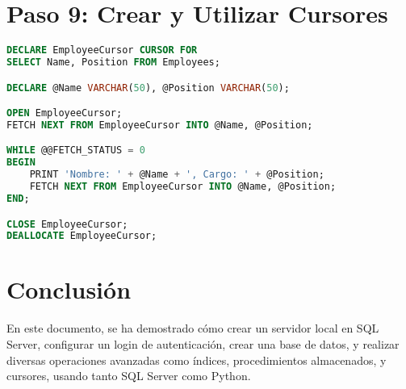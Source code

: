 \documentclass{article}
\begin{document}
\section{Paso 9: Crear y Utilizar Cursores}
\begin{lstlisting}[language=SQL, caption=Uso de cursores para consultas]
DECLARE EmployeeCursor CURSOR FOR
SELECT Name, Position FROM Employees;

DECLARE @Name VARCHAR(50), @Position VARCHAR(50);

OPEN EmployeeCursor;
FETCH NEXT FROM EmployeeCursor INTO @Name, @Position;

WHILE @@FETCH_STATUS = 0
BEGIN
    PRINT 'Nombre: ' + @Name + ', Cargo: ' + @Position;
    FETCH NEXT FROM EmployeeCursor INTO @Name, @Position;
END;

CLOSE EmployeeCursor;
DEALLOCATE EmployeeCursor;
\end{lstlisting}

\section{Conclusión}
En este documento, se ha demostrado cómo crear un servidor local en SQL Server, configurar un login de autenticación, crear una base de datos, y realizar diversas operaciones avanzadas como índices, procedimientos almacenados, y cursores, usando tanto SQL Server como Python.
\end{document}
